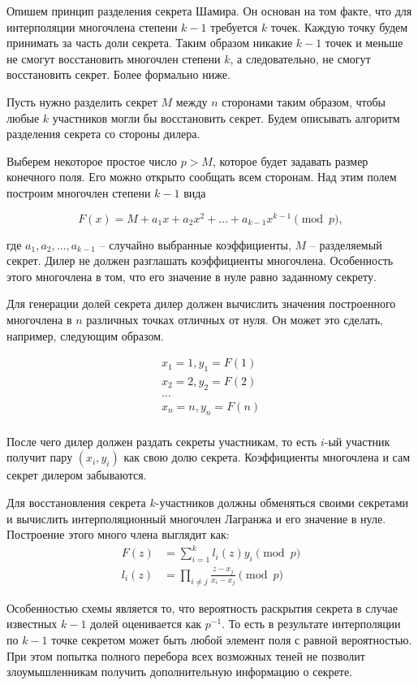 \documentclass[a4paper,12pt]{article}
\theoremstyle{definition}
\begin{document}
		Опишем принцип разделения секрета Шамира. Он основан на том факте, что для интерполяции многочлена степени $k-1$ требуется $k$ точек. Каждую точку будем принимать за часть доли секрета. Таким образом никакие $k-1$ точек и меньше не смогут восстановить многочлен степени $k$, а следовательно, не смогут восстановить секрет. Более формально ниже.
		
		Пусть нужно разделить секрет $M$ между $n$ сторонами таким образом, чтобы любые $k$ участников могли бы восстановить секрет. Будем описывать алгоритм разделения секрета со стороны дилера. 
		
		Выберем некоторое простое число $p>M$, которое будет задавать размер конечного поля. Его можно открыто сообщать всем сторонам. Над этим полем построим многочлен степени $k-1$ вида
		
		\[ F(x) = M + a_1 x + a_2 x^2 + \dots + a_{k-1} x^{k-1} \pmod p, \]
		
		где $a_1, a_2, \dots, a_{k-1}$ – случайно выбранные коэффициенты, $M$ – разделяемый секрет. Дилер не должен разглашать коэффициенты многочлена. Особенность этого многочлена в том, что его значение в нуле равно заданному секрету.
		
		Для генерации долей секрета дилер должен вычислить значения построенного многочлена в $n$ различных точках отличных от нуля. Он может это сделать, например, следующим образом.
		
		\begin{gather*}
			x_1=1, y_1 = F(1) \\
			x_2=2, y_2 = F(2) \\
			\dots 			  \\
			x_n=n, y_n = F(n) \\
		\end{gather*}
		
		После чего дилер должен раздать секреты участникам, то есть $i$-ый участник получит пару $(x_i, y_i)$ как свою долю секрета. Коэффициенты многочлена и сам секрет дилером забываются.
		
		Для восстановления секрета $k$-участников должны обменяться своими секретами и вычислить интерполяционный многочлен Лагранжа и его значение в нуле. Построение этого много члена выглядит как:
		\begin{align*}
			F(z) &= \sum_{i=1}^{k} l_i(z) y_i \pmod p  \\
			l_i(z) &= \prod_{i\ne j} \frac{z-x_j}{x_i - x_j} \pmod p 
		\end{align*}
	
		Особенностью схемы является то, что вероятность раскрытия секрета в случае известных $k-1$ долей оценивается как $p^{-1}$. То есть в результате интерполяции по $k-1$ точке секретом может быть любой элемент поля с равной вероятностью. При этом попытка полного перебора всех возможных теней не позволит злоумышленникам получить дополнительную информацию о секрете.
		
\end{document}
